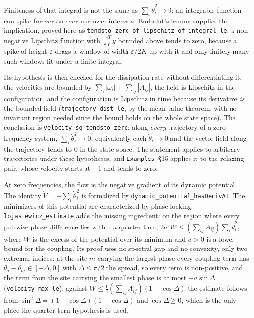 \documentclass{article}
\begin{document}
Finiteness of that integral is not the same as $\sum_i\dot\theta_i^2 \to 0$: an integrable function can spike forever on ever narrower intervals. Barbalat's lemma supplies the implication, proved here as \nolinkurl{tendsto_zero_of_lipschitz_of_integral_le}: a non-negative Lipschitz function with $\int_0^T g$ bounded above tends to zero, because a spike of height $\varepsilon$ drags a window of width $\varepsilon/2K$ up with it and only finitely many such windows fit under a finite integral.

Its hypothesis is then checked for the dissipation rate without differentiating it: the velocities are bounded by $\sum_i|\omega_i| + \sum_{ij}|A_{ij}|$, the field is Lipschitz in the configuration, and the configuration is Lipschitz in time because its derivative \emph{is} the bounded field (\nolinkurl{trajectory_dist_le}, by the mean value theorem, with no invariant region needed since the bound holds on the whole state space). The conclusion is \nolinkurl{velocity_sq_tendsto_zero}: along \emph{every} trajectory of a zero-frequency system, $\sum_i\dot\theta_i^2 \to 0$; equivalently each $\dot\theta_i \to 0$ and the vector field along the trajectory tends to $0$ in the state space. The statement applies to arbitrary trajectories under these hypotheses, and \texttt{Examples}~\S15 applies it to the relaxing pair, whose velocity starts at $-1$ and tends to zero.

At zero frequencies, the flow is the negative gradient of its dynamic potential. The identity $\dot V = -\sum_i\dot\theta_i^2$ is formalized by \nolinkurl{dynamic_potential_hasDerivAt}. The minimizers of this potential are characterized by phase-locking. \nolinkurl{lojasiewicz_estimate} adds the missing ingredient: on the region where every pairwise phase difference lies within a quarter turn, $2a^2W \le \left(\sum_{ij}A_{ij}\right)\sum_i\dot\theta_i^2$, where $W$ is the excess of the potential over its minimum and $a > 0$ is a lower bound for the coupling. Its proof uses no spectral gap and no convexity, only two extremal indices: at the site $m$ carrying the largest phase every coupling term has $\theta_j - \theta_m \in [-\Delta,0]$ with $\Delta \le \pi/2$ the spread, so every term is non-positive, and the term from the site carrying the smallest phase is at most $-a\sin \Delta$ (\nolinkurl{velocity_max_le}); against $W \le \tfrac12\left(\sum_{ij}A_{ij}\right)(1-\cos \Delta)$ the estimate follows from $\sin^2 \Delta = (1-\cos \Delta)(1+\cos \Delta)$ and $\cos \Delta \ge 0$, which is the only place the quarter-turn hypothesis is used.
\end{document}
